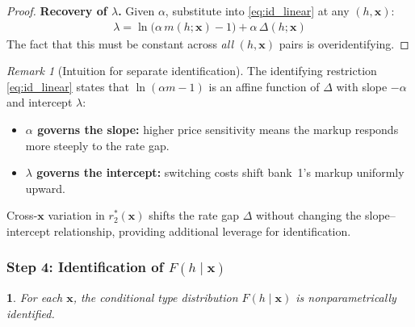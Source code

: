 \documentclass[12pt]{article}
\theoremstyle{plain}
\theoremstyle{plain}
\newtheorem{prop}[thm]{\protect\propositionname}
\theoremstyle{definition}  %
\theoremstyle{remark}  %
\newtheorem{remark}[thm]{Remark}  %
\providecommand{\propositionname}{Proposition}
\begin{document}
\begin{proof}
\medskip\noindent
\textbf{Recovery of $\lambda$.} Given $\alpha$, substitute into \eqref{eq:id_linear} at any $(h, \mathbf{x})$:
\begin{align}\label{eq:id_lambda}
    \lambda = \ln\!\big(\alpha\, m(h;\mathbf{x}) - 1\big) + \alpha\, \Delta(h;\mathbf{x})
\end{align}
The fact that this must be constant across \emph{all} $(h, \mathbf{x})$ pairs is overidentifying.
\end{proof}

\begin{remark}[Intuition for separate identification]\label{rem:id_intuition}
The identifying restriction \eqref{eq:id_linear} states that $\ln(\alpha m - 1)$ is an affine function of $\Delta$ with slope $-\alpha$ and intercept $\lambda$:
\begin{itemize}
    \item \textbf{$\alpha$ governs the slope:} higher price sensitivity means the markup responds more steeply to the rate gap.
    \item \textbf{$\lambda$ governs the intercept:} switching costs shift bank~1's markup uniformly upward.
\end{itemize}
Cross-$\mathbf{x}$ variation in $r_2^*(\mathbf{x})$ shifts the rate gap $\Delta$ without changing the slope--intercept relationship, providing additional leverage for identification.
\end{remark}


\subsubsection{Step 4: Identification of $F(h \mid \mathbf{x})$}

\begin{prop}\label{prop:id_F}
For each $\mathbf{x}$, the conditional type distribution $F(h \mid \mathbf{x})$ is nonparametrically identified.
\end{prop}
\end{document}
